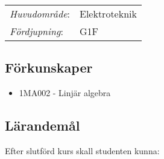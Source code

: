 \begin{tabular}{ll}\emph{Huvudområde}: & Elektroteknik\tabularnewline\emph{Fördjupning}: & G1F\tabularnewline\end{tabular}

\subsection*{Förkunskaper}

\begin{itemize}
\tightlist
\item
  1MA002 - Linjär algebra
\end{itemize}

\subsection*{Lärandemål}

Efter slutförd kurs skall studenten kunna:

